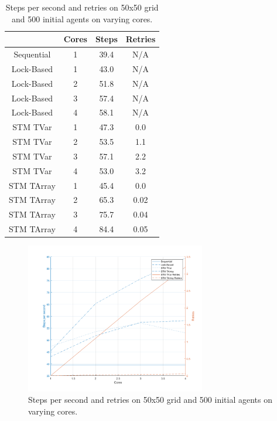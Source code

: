 \begin{table}
	\centering
  	\begin{tabular}{ c || c | c | c }
                   & Cores & Steps & Retries  \\ \hline \hline 
    	Sequential & 1     & 39.4  & N/A      \\ \hline \hline   

    	Lock-Based & 1     & 43.0  & N/A       \\ \hline
    	Lock-Based & 2     & 51.8  & N/A       \\ \hline
    	Lock-Based & 3     & 57.4  & N/A       \\ \hline
    	Lock-Based & 4     & 58.1  & N/A       \\ \hline \hline   
   		
   		STM TVar   & 1     & 47.3  & 0.0       \\ \hline
   		STM TVar   & 2     & 53.5  & 1.1       \\ \hline
   		STM TVar   & 3     & 57.1  & 2.2 	   \\ \hline
   		STM TVar   & 4     & 53.0  & 3.2	   \\ \hline \hline   
   		
   		STM TArray & 1     & 45.4  & 0.0 	   \\ \hline
   		STM TArray & 2     & 65.3  & 0.02      \\ \hline
   		STM TArray & 3     & 75.7  & 0.04      \\ \hline
   		STM TArray & 4     & 84.4  & 0.05	   \\ \hline \hline   
   	\end{tabular}
  	
  	\caption{Steps per second and retries on 50x50 grid and 500 initial agents on varying cores.}
	\label{tab:varying_cores}
\end{table}

\begin{figure}
	\centering
	\includegraphics[width=0.7\textwidth, angle=0]{./fig/sugarscape/varying_cores.png}
	\caption{Steps per second and retries on 50x50 grid and 500 initial agents on varying cores.}
	\label{fig:varying_cores}
\end{figure}

